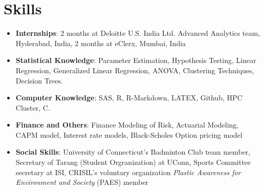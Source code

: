 \documentclass[letterpaper,11pt]{article}
\newcommand{\resumeItem}[2]{
  \item\small{
    \textbf{#1}{: #2 \vspace{-2pt}}
  }
}
\newcommand{\resumeSubItem}[2]{\resumeItem{#1}{#2}\vspace{-4pt}}
\newcommand{\resumeSubHeadingListStart}{\begin{itemize}[leftmargin=*]}
\newcommand{\resumeSubHeadingListEnd}{\end{itemize}}
\begin{document}
\section{Skills}
  \resumeSubHeadingListStart
    \resumeSubItem{Internships}
      {2 months at Deloitte U.S. India Ltd. Advanced Analytics team, Hyderabad, India, 2 months at eClerx, Mumbai, India}
    \resumeSubItem{Statistical Knowledge}
      {Parameter Estimation, Hypothesis Testing, Linear Regression, Generalized Linear Regression, ANOVA, Clustering Techniques, Decision Trees.}
    \resumeSubItem{Computer Knowledge}
      {SAS, R, R-Markdown, LATEX, Github, HPC Cluster, C.}
    \resumeSubItem{Finance and Others}
      {Finance Modeling of Risk, Actuarial Modeling, CAPM model, Interest rate models, Black-Scholes Option pricing model}
    \resumeSubItem{Social Skills}
      {University of Connecticut's Badminton Club team member, Secretary of Tarang (Student Orgranization) at UConn, Sports Committee secretary at ISI, CRISIL's voluntary organization \textit{Plastic Awareness for Environment and Society} (PAES) member}      
  \resumeSubHeadingListEnd

%


\end{document}
